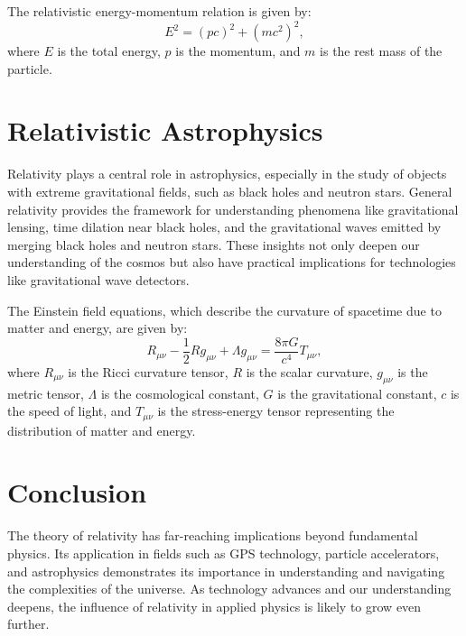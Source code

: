 \documentclass[11pt]{article}
\begin{document}
The relativistic energy-momentum relation is given by:
\begin{equation}
    E^2 = (pc)^2 + (mc^2)^2,
\end{equation}
where $E$ is the total energy, $p$ is the momentum, and $m$ is the rest mass of the particle.

\section{Relativistic Astrophysics}
Relativity plays a central role in astrophysics, especially in the study of objects with extreme gravitational fields, such as black holes and neutron stars. General relativity provides the framework for understanding phenomena like gravitational lensing, time dilation near black holes, and the gravitational waves emitted by merging black holes and neutron stars. These insights not only deepen our understanding of the cosmos but also have practical implications for technologies like gravitational wave detectors.

The Einstein field equations, which describe the curvature of spacetime due to matter and energy, are given by:
\begin{equation}
    R_{\mu\nu} - \frac{1}{2}Rg_{\mu\nu} + \Lambda g_{\mu\nu} = \frac{8\pi G}{c^4} T_{\mu\nu},
\end{equation}
where $R_{\mu\nu}$ is the Ricci curvature tensor, $R$ is the scalar curvature, $g_{\mu\nu}$ is the metric tensor, $\Lambda$ is the cosmological constant, $G$ is the gravitational constant, $c$ is the speed of light, and $T_{\mu\nu}$ is the stress-energy tensor representing the distribution of matter and energy.

\section{Conclusion}
The theory of relativity has far-reaching implications beyond fundamental physics. Its application in fields such as GPS technology, particle accelerators, and astrophysics demonstrates its importance in understanding and navigating the complexities of the universe. As technology advances and our understanding deepens, the influence of relativity in applied physics is likely to grow even further.
\end{document}
